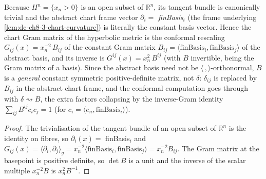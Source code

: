 \begin{lemma}
  \label{lem:dc-ch8-3-hyperbolic-chart-gram}
  \leanok
  Because $H^n=\{x_n>0\}$ is an open subset of $\mathbb R^n$, its tangent bundle is
  canonically trivial and the abstract chart frame vector
  $\partial_i=$ \emph{finBasis}$_i$ (the frame underlying \cref{lem:dc-ch8-3-chart-curvature})
  is literally the constant basis vector. Hence the chart Gram matrix of the
  hyperbolic metric is the conformal rescaling
  $G_{ij}(x)=x_n^{-2}\,B_{ij}$ of the constant Gram matrix
  $B_{ij}=\langle\text{finBasis}_i,\text{finBasis}_j\rangle$ of the abstract basis,
  and its inverse is $G^{ij}(x)=x_n^{2}\,B^{ij}$ (with $B$ invertible, being the
  Gram matrix of a basis). Since the abstract basis need not be
  $\langle\,,\rangle$-orthonormal, $B$ is a \emph{general} constant symmetric
  positive-definite matrix, not $\delta$: $\delta_{ij}$ is
  replaced by $B_{ij}$ in the abstract chart frame, and the conformal
  computation goes through with $\delta\rightsquigarrow B$, the extra factors
  collapsing by the inverse-Gram identity $\sum_{ij}B^{ij}c_ic_j=1$ (for
  $c_i=\langle e_n,\text{finBasis}_i\rangle$).
\end{lemma}
\begin{proof}
  \leanok
\sketch
  The trivialisation of the tangent bundle of an open subset of $\mathbb R^n$ is
  the identity on fibres, so $\partial_i(x)=$ finBasis$_i$ and
  $G_{ij}(x)=\langle\partial_i,\partial_j\rangle_g=x_n^{-2}\langle\text{finBasis}_i,\text{finBasis}_j\rangle=x_n^{-2}B_{ij}$.
  The Gram matrix at the basepoint is positive definite, so $\det B$ is a unit and
  the inverse of the scalar multiple $x_n^{-2}B$ is $x_n^{2}B^{-1}$.
\end{proof}

